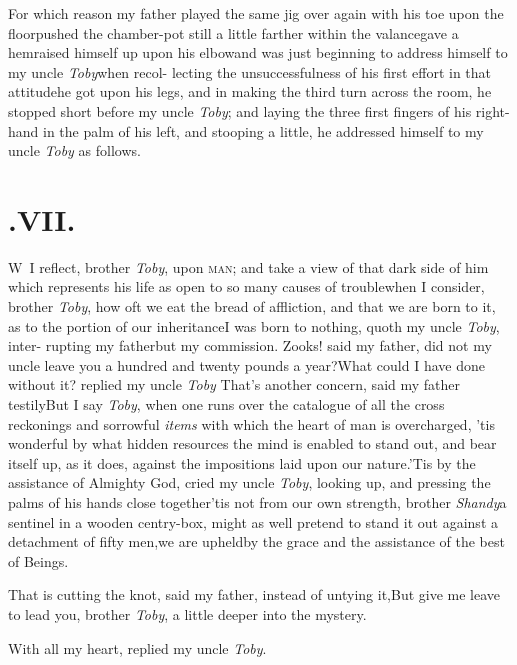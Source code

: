 \documentclass{article}
\begin{document}
For which reason my father played the same jig over again with
his toe upon the floor\tsh pushed the chamber-pot still a
little farther within the valance\tsk gave a hem\tsk raised
himself up upon his elbow\tsk and was just beginning to address
himself to my uncle \textit{Toby}\tsk when recol-\pb
lecting the unsuccessfulness of his first effort in that
attitude\tsk he got upon his legs, and in making the third
turn across the room, he stopped short before my uncle
\textit{Toby}; and laying the three first fingers of his
right-hand in the palm of his left, and stooping a little,
he addressed himself to my uncle \textit{Toby} as follows.

\bigskip
\section{.\enspace VII.}

\lettrine{W}{\,} I reflect, brother \textit{Toby},\break
upon \textsc{man}; and take a view of\break
that dark side of him which represents his life as open to
so many causes of trouble\tsk when I consider, brother
\textit{Toby}, how oft we eat the bread of affliction, and
that we are born to it, as to the portion of our
inheritance\tsk I was born to nothing, quoth my uncle
\textit{Toby}, inter-\pb
rupting my father\tsk but my commission.
Zooks! said my father, did not my uncle leave you a hundred
and twenty pounds a year?\tsh What could I have done without
it? replied my uncle \textit{Toby} \tsh That’s another
concern, said my father testily\tsk But I say \textit{Toby},
when one runs over the catalogue of all the cross reckonings
and sorrowful \textit{items} with which the heart of man is
overcharged, ’tis wonderful by what hidden resources the
mind is enabled to stand out, and bear itself up, as it
does, against the impositions laid upon our nature.\tsh ’Tis
by the assistance of Almighty God, cried my uncle
\textit{Toby}, looking up, and pressing the palms of his
hands close together\tsk ’tis not from our own strength,
brother \textit{Shandy}\tsk a sentinel in a wooden
centry-box, might as well pretend to stand it out against a
detachment of fifty men,\tsk we are upheld\pb by the grace and
the assistance of the best of Beings.

\tsk That is cutting the knot, said my father, instead
of untying it,\tsk But give me leave to lead you, brother
\textit{Toby}, a little deeper into the mystery.

With all my heart, replied my uncle \textit{Toby}.
\end{document}
